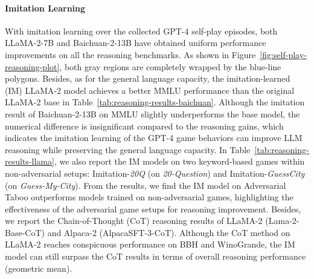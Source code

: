 \documentclass{article}
\theoremstyle{plain}
\theoremstyle{definition}
\theoremstyle{remark}
\begin{document}
\paragraph{Imitation Learning} With imitation learning over the collected GPT-4 self-play episodes, both LLaMA-2-7B and Baichuan-2-13B have obtained uniform performance improvements on all the reasoning benchmarks. As shown in Figure~\ref{fig:self-play-reasoning-plot},  both gray regions are completely wrapped by the blue-line polygons. Besides, as for the general language capacity, the imitation-learned (IM) LLaMA-2 model achieves a better MMLU performance than the original LLaMA-2 base in Table~\ref{tab:reasoning-results-baichuan}. Although the imitation result of Baichuan-2-13B on MMLU slightly underperforms the base model, the numerical difference is insignificant compared to the reasoning gains, which indicates the imitation learning of the GPT-4 game behaviors can improve LLM reasoning while preserving the general language capacity. In Table~\ref{tab:reasoning-results-llama}, we also report the IM models on two keyword-based games within non-adversarial setups: Imitation-\textit{20Q} (on \textit{20-Question}) and Imitation-\textit{GuessCity} (on \textit{Guess-My-City}). From the results, we find the IM model on Adversarial Taboo outperforms models trained on non-adversarial games, highlighting the effectiveness of the adversarial game setups for reasoning improvement. Besides, we report the Chain-of-Thought (CoT) reasoning results of LLaMA-2 (Lama-2-Base-CoT) and Alpaca-2 (AlpacaSFT-3-CoT). Although the CoT method on LLaMA-2 reaches conspicuous performance on BBH and WinoGrande, the IM model can still surpass the CoT results in terms of overall reasoning performance (geometric mean). 



 \vspace{-1mm}
\end{document}
